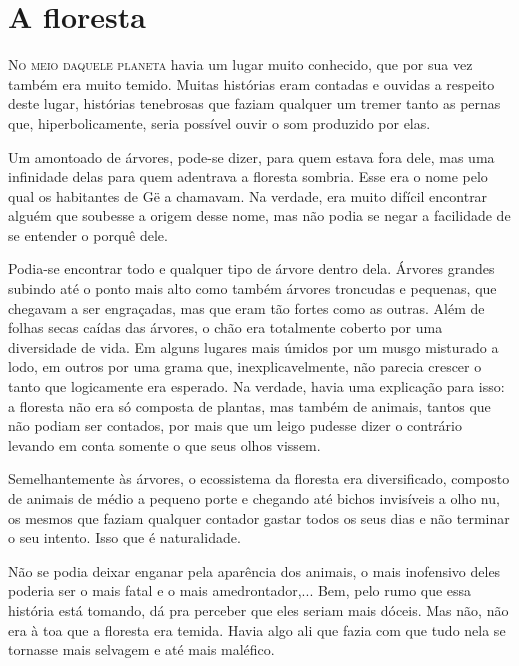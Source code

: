 

\chapter{A floresta}
\lettrine{N}{o meio daquele planeta} havia um lugar muito conhecido, que por sua vez também era muito temido. Muitas histórias eram contadas e ouvidas a respeito deste lugar, histórias tenebrosas que faziam qualquer um tremer tanto as pernas que, hiperbolicamente, seria possível ouvir o som produzido por elas.

Um amontoado de árvores, pode-se dizer, para quem estava fora dele, mas uma infinidade delas para quem adentrava a floresta sombria. Esse era o nome pelo qual os habitantes de Gë a chamavam. Na verdade, era muito difícil encontrar alguém que soubesse a origem desse nome, mas não podia se negar a facilidade de se entender o porquê dele.

Podia-se encontrar todo e qualquer tipo de árvore dentro dela. Árvores grandes subindo até o ponto mais alto como também árvores troncudas e pequenas, que chegavam a ser engraçadas, mas que eram tão fortes como as outras. Além de folhas secas caídas das árvores, o chão era totalmente coberto por uma diversidade de vida. Em alguns lugares mais úmidos por um musgo misturado a lodo, em outros por uma grama que, inexplicavelmente, não parecia crescer o tanto que logicamente era esperado. Na verdade, havia uma explicação para isso: a floresta não era só composta de plantas, mas também de animais, tantos que não podiam ser contados, por mais que um leigo pudesse dizer o contrário levando em conta somente o que seus olhos vissem.

Semelhantemente às árvores, o ecossistema da floresta era diversificado, composto de animais de médio a pequeno porte e chegando até bichos invisíveis a olho nu, os mesmos que faziam qualquer contador gastar todos os seus dias e não terminar o seu intento. Isso que é naturalidade. 

Não se podia deixar enganar pela aparência dos animais, o mais inofensivo deles poderia ser o mais fatal e o mais amedrontador,... Bem, pelo rumo que essa história está tomando, dá pra perceber que eles seriam mais dóceis. Mas não, não era à toa que a floresta era temida. Havia algo ali que fazia com que tudo nela se tornasse mais selvagem e até mais maléfico.

